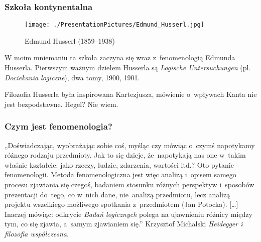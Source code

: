 \documentclass[10pt,t]{beamer}
\begin{document}
\begin{frame}
  \frametitle{Szkoła kontynentalna}


  \begin{figure}

    \centering

    \texttt{[image: ./PresentationPictures/Edmund\_Husserl.jpg]}


    \caption{Edmund Husserl (1859--1938)}

  \end{figure}



  W moim mniemaniu ta szkoła zaczyna się wraz z~fenomenologią Edmunda
  Husserla. Pierwszym ważnym dziełem Husserla są \textit{Logische
    Untersuchungen} (pl. \textit{Dociekania logiczne}), dwa tomy,
  1900, 1901.

  Filozofia Husserla była inspirowana Kartezjusza, mówienie o~wpływach
  Kanta nie jest bezpodstawne. Hegel? Nie wiem.

\end{frame}





\begin{frame}
  \frametitle{Czym jest fenomenologia?}


  „Doświadczając, wyobrażając sobie coś, myśląc czy mówiąc o~czymś
  napotykamy różnego rodzaju przedmioty. Jak to się dzieje,
  że~napotykają nas one w~takim właśnie kształcie: jako rzeczy,
  ludzie, zdarzenia, wartości itd.? Oto pytanie fenomenologii. Metoda
  fenomenologiczna jest więc analizą i~opisem samego procesu zjawiania
  się czegoś, badaniem stosunku różnych perspektyw i~sposobów
  prezentacji do~tego, co w~nich dane, nie~analizą przedmiotu, lecz
  analizą projektu wszelkiego możliwego spotkania z~przedmiotem (Jan
  Potocka). [\ldots] Inaczej mówiąc: odkrycie \textit{Badań logicznych}
  polega na ujawnieniu różnicy między tym, co się zjawia, a~samym
  zjawianiem się.” Krzysztof Michalski \textit{Heidegger i filozofia
    współczesna}.

\end{frame}
\end{document}
